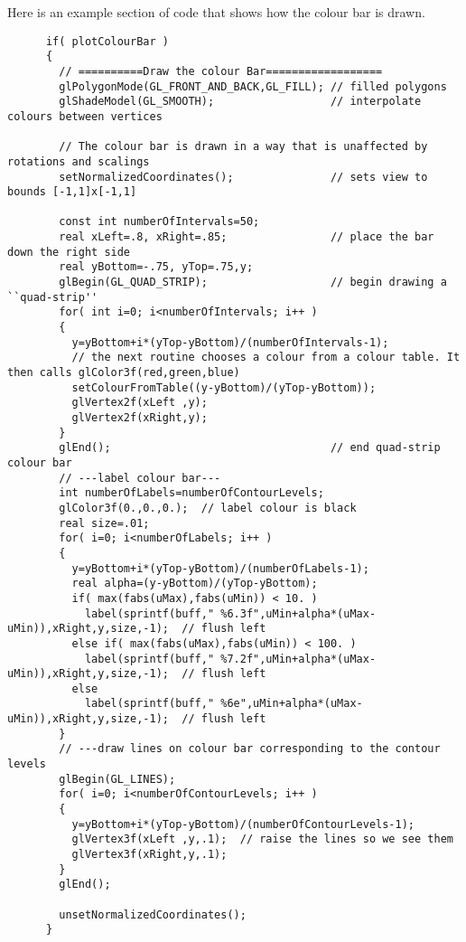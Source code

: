 \documentclass{article}
\begin{document}
Here is an example section of code that shows how the colour bar
is drawn.
{\footnotesize\begin{verbatim}
      if( plotColourBar )
      {
        // ==========Draw the colour Bar==================
        glPolygonMode(GL_FRONT_AND_BACK,GL_FILL); // filled polygons
        glShadeModel(GL_SMOOTH);                  // interpolate colours between vertices

        // The colour bar is drawn in a way that is unaffected by rotations and scalings 
        setNormalizedCoordinates();               // sets view to bounds [-1,1]x[-1,1]

        const int numberOfIntervals=50;
        real xLeft=.8, xRight=.85;                // place the bar down the right side
        real yBottom=-.75, yTop=.75,y;
        glBegin(GL_QUAD_STRIP);                   // begin drawing a ``quad-strip''
        for( int i=0; i<numberOfIntervals; i++ )
        {
          y=yBottom+i*(yTop-yBottom)/(numberOfIntervals-1);
          // the next routine chooses a colour from a colour table. It then calls glColor3f(red,green,blue)
          setColourFromTable((y-yBottom)/(yTop-yBottom));    
          glVertex2f(xLeft ,y);
          glVertex2f(xRight,y);
        }
        glEnd();                                  // end quad-strip colour bar
        // ---label colour bar---
        int numberOfLabels=numberOfContourLevels;
        glColor3f(0.,0.,0.);  // label colour is black
        real size=.01;
        for( i=0; i<numberOfLabels; i++ )
        {
          y=yBottom+i*(yTop-yBottom)/(numberOfLabels-1);
          real alpha=(y-yBottom)/(yTop-yBottom);
          if( max(fabs(uMax),fabs(uMin)) < 10. )
            label(sprintf(buff," %6.3f",uMin+alpha*(uMax-uMin)),xRight,y,size,-1);  // flush left
          else if( max(fabs(uMax),fabs(uMin)) < 100. )
            label(sprintf(buff," %7.2f",uMin+alpha*(uMax-uMin)),xRight,y,size,-1);  // flush left
          else
            label(sprintf(buff," %6e",uMin+alpha*(uMax-uMin)),xRight,y,size,-1);  // flush left
        }
        // ---draw lines on colour bar corresponding to the contour levels
        glBegin(GL_LINES);
        for( i=0; i<numberOfContourLevels; i++ )
        {
          y=yBottom+i*(yTop-yBottom)/(numberOfContourLevels-1);
          glVertex3f(xLeft ,y,.1);  // raise the lines so we see them
          glVertex3f(xRight,y,.1);
        }
        glEnd();
      
        unsetNormalizedCoordinates();
      }
\end{verbatim}
}
\end{document}
